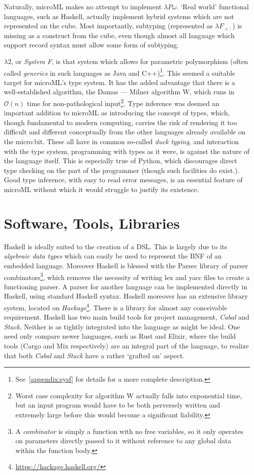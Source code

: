 \documentclass[12pt, a4paper]{report}
\begin{document}
Naturally, microML makes no attempt to implement $\lambda P\omega$. `Real world' functional
languages, such as Haskell, actually implement hybrid systems which are not represented on the cube.
Most importantly, subtyping (represented as $\lambda F_{<:}$) is missing as a construct from the cube, 
even though almost all language which support record syntax must allow some form of subtyping.

$\lambda 2$, or \textit{System F}, is that system which allows for \gls{parametric polymorphism} (often
called \textit{generics} in such languages as Java and C++)\footnote{See~\ref{appendix:sysf} for
details for a more complete description.}. This seemed a suitable target for microML's type system.
It has the added advantage that there is a well-established algorithm, the Damas --- Milner algorithm
W, which runs in $\mathcal{O}(n)$ time for non-pathological input\footnote{Worst case complexity
for algorithm W actually falls into exponential time, but an input program would have to be both
perversely written and extremely large before this would become a significant liability.}. Type
inference was deemed an important addition to microML as introducing the concept of types, which,
though fundamental to modern computing, carries the risk of rendering it too difficult and different
conceptually from the other languages already available on the micro:bit. These all have in common
so-called \textit{\gls{duck typing}}, and interaction with the type system, programming with types as
it were, is against the nature of the language itself. This is especially true of Python, which
discourages direct type checking on the part of the programmer (though such facilities do exist.).
Good type inference, with easy to read error messages, is an essential feature of microML without
which it would struggle to justify its existence.

\section{Software, Tools, Libraries}
Haskell is ideally suited to the creation of a \gls{DSL}. This is largely due to its
\textit{algebraic data types} which can easily be used to represent the BNF of an embedded
language. Moreover Haskell is blessed with the Parsec library of parser combinators\footnote{A
\textit{combinator} is simply a function with no free variables, so it only operates on
parameters directly passed to it without reference to any global data within the function
body.}, which removes the necessity of writing lex and yacc files to create a functioning
parser. A parser for another language can be implemented directly in Haskell, using
standard Haskell syntax. Haskell moreover has an extensive library system, located on
\textit{Hackage}\footnote{\url{https://hackage.haskell.org/}}. There is a library for almost any
conceivable requirement. Haskell has two main build tools for project management, \textit{Cabal} and
\textit{Stack}. Neither is as tightly integrated into the language as might be ideal. One need only
compare newer languages, such as Rust and Elixir, where the build tools (Cargo and Mix respectively)
are an integral part of the language, to realize that both \textit{Cabal} and \textit{Stack} have a
rather `grafted on' aspect.
\end{document}
